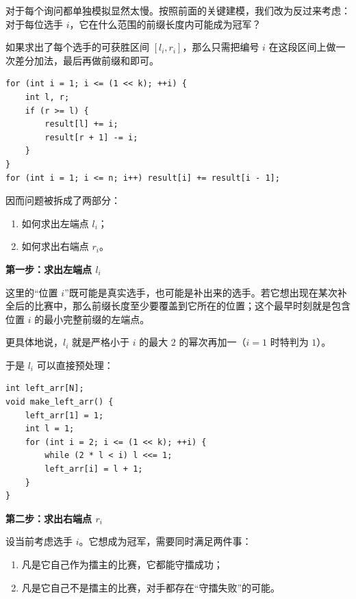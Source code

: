 \documentclass{book}
\begin{document}
    对于每个询问都单独模拟显然太慢。按照前面的关键建模，我们改为反过来考虑：对于每位选手 $i$，它在什么范围的前缀长度内可能成为冠军？

    如果求出了每个选手的可获胜区间 $[l_i,r_i]$，那么只需把编号 $i$ 在这段区间上做一次差分加法，最后再做前缀和即可。

    \begin{lstlisting}[style = code]
for (int i = 1; i <= (1 << k); ++i) {
    int l, r;
    if (r >= l) {
        result[l] += i;
        result[r + 1] -= i;
    }
}
for (int i = 1; i <= n; i++) result[i] += result[i - 1];\end{lstlisting}

    因而问题被拆成了两部分：

    \begin{enumerate}[leftmargin=2em,itemsep=1pt,topsep=2pt,parsep=0pt,partopsep=0pt]
        \item 如何求出左端点 $l_i$；
        \item 如何求出右端点 $r_i$。
    \end{enumerate}

    \par\medskip
    \noindent\textbf{第一步：求出左端点 $l_i$}
    \par\medskip

    这里的“位置 $i$”既可能是真实选手，也可能是补出来的选手。若它想出现在某次补全后的比赛中，那么前缀长度至少要覆盖到它所在的位置；这个最早时刻就是包含位置 $i$ 的最小完整前缀的左端点。

    更具体地说，$l_i$ 就是严格小于 $i$ 的最大 $2$ 的幂次再加一（$i=1$ 时特判为 $1$）。

    于是 $l_i$ 可以直接预处理：

  \begin{lstlisting}[style = code]
int left_arr[N];
void make_left_arr() {
    left_arr[1] = 1;
    int l = 1;
    for (int i = 2; i <= (1 << k); ++i) {
        while (2 * l < i) l <<= 1;
        left_arr[i] = l + 1;
    }
} \end{lstlisting}

    \par\medskip
    \noindent\textbf{第二步：求出右端点 $r_i$}
    \par\medskip

    设当前考虑选手 $i$。它想成为冠军，需要同时满足两件事：

    \begin{enumerate}[leftmargin=2em,itemsep=1pt,topsep=2pt,parsep=0pt,partopsep=0pt]
        \item 凡是它自己作为擂主的比赛，它都能守擂成功；
        \item 凡是它自己不是擂主的比赛，对手都存在“守擂失败”的可能。
    \end{enumerate}
\end{document}
